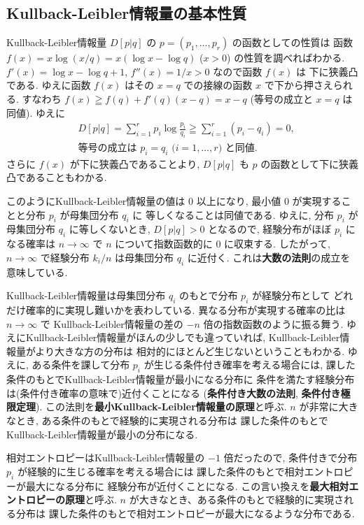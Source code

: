 \documentclass[12pt,twoside]{jarticle}
\theoremstyle{definition} %
\theoremstyle{definition} %
\theoremstyle{definition} %
\numberwithin{theorem}{section}
\numberwithin{equation}{section}
\numberwithin{figure}{section}
\numberwithin{table}{section}
\begin{document}
\subsection{Kullback-Leibler情報量の基本性質}
\label{sec:KL-prop}

Kullback-Leibler情報量 $D[p|q]$ の $p=(p_1,\ldots,p_r)$ の函数としての性質は
函数 $f(x)=x\log(x/q)=x(\log x-\log q)$ ($x>0$) の性質を調べればわかる.
$f'(x)=\log x-\log q + 1$, $f''(x)=1/x>0$ なので函数 $f(x)$ は
下に狭義凸である.
ゆえに函数 $f(x)$ はその $x=q$ での接線の函数 $x$ で下から押さえられる.
すなわち $f(x)\geqq f(q)+f'(q)(x-q)=x-q$ (等号の成立と $x=q$ は同値).
ゆえに
\begin{align*}
&
D[p|q]=\sum_{i=1}^r p_i\log\frac{p_i}{q_i}\geqq \sum_{i=1}^r(p_i-q_i)=0,
\\ &
\text{等号の成立は $p_i=q_i$ ($i=1,\ldots,r$) と同値.}
\end{align*}
さらに $f(x)$ が下に狭義凸であることより, 
$D[p|q]$ も $p$ の函数として下に狭義凸であることもわかる.

このようにKullback-Leibler情報量の値は $0$ 以上になり, 
最小値 $0$ が実現することと分布 $p_i$ が母集団分布 $q_i$ に
等しくなることは同値である.
ゆえに, 分布 $p_i$ が母集団分布 $q_i$ に等しくないとき, 
$D[p|q]>0$ となるので, 
経験分布がほぼ $p_i$ になる確率は $n\to\infty$ で
$n$ について指数函数的に $0$ に収束する.
したがって, $n\to\infty$ で経験分布 $k_i/n$ は母集団分布 $q_i$ に近付く.
これは{\bf 大数の法則}の成立を意味している.

Kullback-Leibler情報量は母集団分布 $q_i$ のもとで分布 $p_i$ が経験分布として
どれだけ確率的に実現し難いかを表わしている.
異なる分布が実現する確率の比は $n\to\infty$ で
Kullback-Leibler情報量の差の $-n$ 倍の指数函数のように振る舞う.
ゆえにKullback-Leibler情報量がほんの少しでも違っていれば, 
Kullback-Leibler情報量がより大きな方の分布は
相対的にほとんど生じないということもわかる.
ゆえに, ある条件を課して分布 $p_i$ が生じる条件付き確率を考える場合には, 
課した条件のもとでKullback-Leibler情報量が最小になる分布に
条件を満たす経験分布は(条件付き確率の意味で)近付くことになる
({\bf 条件付き大数の法則}, {\bf 条件付き極限定理}).
この法則を{\bf 最小Kullback-Leibler情報量の原理}と呼ぶ.
$n$ が非常に大きなとき, ある条件のもとで経験的に実現される分布は
課した条件のもとでKullback-Leibler情報量が最小の分布になる.

相対エントロピーはKullback-Leibler情報量の $-1$ 倍だったので,
条件付きで分布 $p_i$ が経験的に生じる確率を考える場合には
課した条件のもとで相対エントロピーが最大になる分布に
経験分布が近付くことになる.
この言い換えを{\bf 最大相対エントロピーの原理}と呼ぶ.
$n$ が大きなとき、ある条件のもとで経験的に実現される分布は
課した条件のもとで相対エントロピーが最大になるような分布である.
\end{document}
